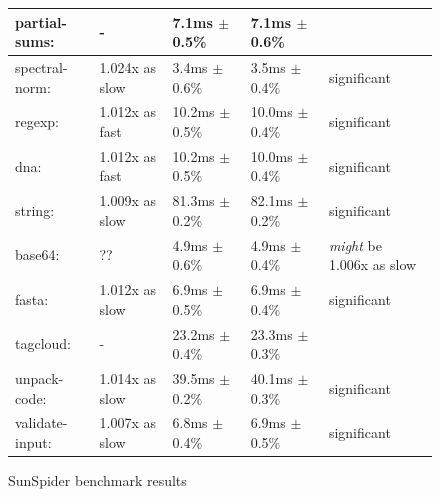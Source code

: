 \documentclass{article}
\begin{document}
\begin{figure}[H]
\begin{tabular}{|l|l|l|l|l|}
\hline\hspace{0.5em} partial-sums:      & -                &   7.1ms $\pm$ 0.5\% &    7.1ms $\pm$ 0.6\% & \\
\hline\hspace{0.5em} spectral-norm:     & 1.024x as slow &   3.4ms $\pm$ 0.6\% &    3.5ms $\pm$ 0.4\%   &  significant \\
\hline\hline
regexp:              & 1.012x as fast   &  10.2ms $\pm$ 0.5\% &   10.0ms $\pm$ 0.4\%   &  significant \\
\hline\hspace{0.5em} dna:               & 1.012x as fast   &  10.2ms $\pm$ 0.5\% &   10.0ms $\pm$ 0.4\%   &  significant \\
\hline\hline
string:              & 1.009x as slow &  81.3ms $\pm$ 0.2\% &   82.1ms $\pm$ 0.2\%   &  significant \\
\hline\hspace{0.5em} base64:            & ??               &   4.9ms $\pm$ 0.6\% &    4.9ms $\pm$ 0.4\%   &  \textit{might} be 1.006x as slow \\
\hline\hspace{0.5em} fasta:             & 1.012x as slow &   6.9ms $\pm$ 0.5\% &    6.9ms $\pm$ 0.4\%   &  significant \\
\hline\hspace{0.5em} tagcloud:          & -                &  23.2ms $\pm$ 0.4\% &   23.3ms $\pm$ 0.3\% & \\
\hline\hspace{0.5em} unpack-code:       & 1.014x as slow &  39.5ms $\pm$ 0.2\% &   40.1ms $\pm$ 0.3\%   &  significant \\
\hline\hspace{0.5em} validate-input:    & 1.007x as slow &   6.8ms $\pm$ 0.4\% &    6.9ms $\pm$ 0.5\%   &  significant  \\
\hline
\end{tabular}
\caption{SunSpider benchmark results}
\label{fig:sunspider}
\end{figure}
\end{document}
